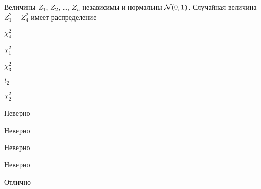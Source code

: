 
\begin{question}
Величины \(Z_1\), \(Z_2\), \ldots, \(Z_n\) независимы и нормальны
\(\mathcal{N}(0,1)\). Случайная величина \(Z_1^2+Z_4^2\) имеет распределение
\begin{answerlist}
  \item \(\chi^2_4\)
  \item \(\chi^2_1\)
  \item \(\chi^2_3\)
  \item \(t_2\)
  \item \(\chi^2_2\)
\end{answerlist}
\end{question}

\begin{solution}
\begin{answerlist}
  \item Неверно
  \item Неверно
  \item Неверно
  \item Неверно
  \item Отлично
\end{answerlist}
\end{solution}

